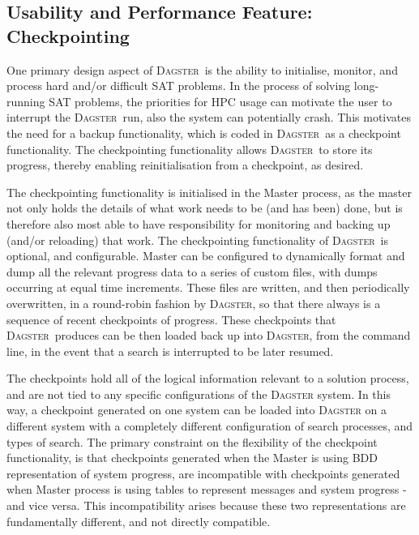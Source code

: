\documentclass[10pt,a4paper,oneside,headinclude,footinclude,BCOR5mm]{scrartcl}
\newcommand{\dagster}{\textsc{Dagster}\xspace}
\begin{document}
\FloatBarrier
\pagebreak
\subsection{Usability and Performance Feature: Checkpointing}\label{sec:checkpointing}

One primary design aspect of \dagster\ is the ability to initialise, monitor, and process hard and/or difficult SAT problems.
In the process of solving long-running SAT problems, the priorities for HPC usage can motivate the user to interrupt the \dagster\ run, also the system can potentially crash.
This motivates the need for a backup functionality, which is coded in \dagster\ as a checkpoint functionality.
The checkpointing functionality allows \dagster\ to store its progress, thereby enabling reinitialisation from a checkpoint, as desired.

The checkpointing functionality is initialised in the Master process, as the master not only holds the details of what work needs to be (and has been) done, but is therefore also most able to have responsibility for monitoring and backing up (and/or reloading) that work.
The checkpointing functionality of \dagster\ is optional, and configurable.
Master can be configured to dynamically format and dump all the relevant progress data to a series of custom files, with dumps occurring at equal time increments.
These files are written, and then periodically overwritten, in a round-robin fashion by \dagster, so that there always is a sequence of recent checkpoints of progress.
These checkpoints that \dagster\ produces can be then loaded back up into \dagster, from the command line, in the event that a search is interrupted to be later resumed.

The checkpoints hold all of the logical information relevant to a solution process, and are not tied to any specific configurations of the \dagster system.
In this way, a checkpoint generated on one system can be loaded into \dagster on a different system with a completely different configuration of search processes, and types of search.
The primary constraint on the flexibility of the checkpoint functionality, is that checkpoints generated when the Master is using BDD representation of system progress, are incompatible with checkpoints generated when Master process is using tables to represent messages and system progress - and vice versa.
This incompatibility arises because these two representations are fundamentally different, and not directly compatible.
\end{document}

